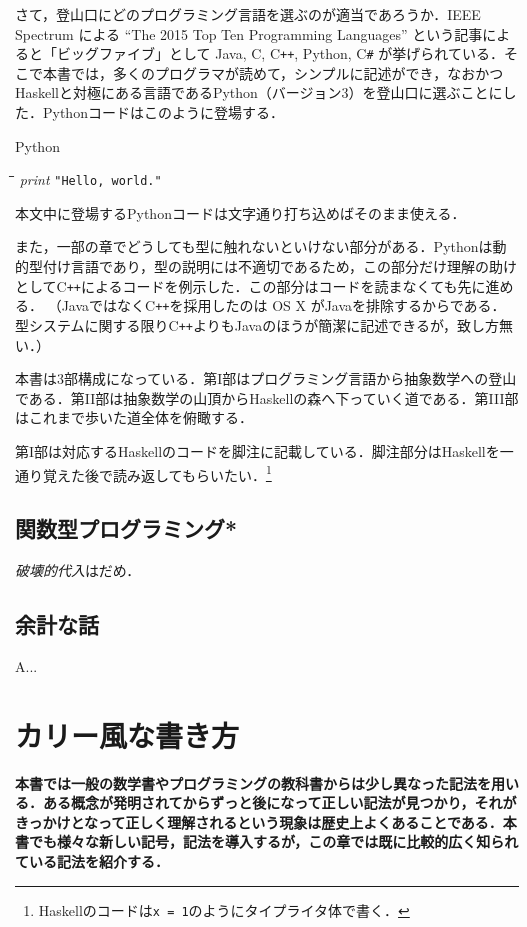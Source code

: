 \documentclass[twocolumn]{jsbook}
\newcommand{\cxx}{\textrm{C}\texttt{++}}
\newcommand{\keyword}[1]{{\emph{#1}}}
\newcommand{\code}[1]{\texttt{#1}}
\newenvironment{leader}{\begingroup\bf}{\endgroup}
\newenvironment{pythoncode}{\begin{itembox}[r]{Python}}{\end{itembox}}
\newenvironment{python}{\begin{tabbing}\hspace*{1em}\=\hspace*{1em}\=\hspace*{1em}\=\hspace*{1em}\=\kill}{\end{tabbing}}
\newcommand{\pthnId}[1]{\textit{#1}}
\newcommand{\pthnString}[1]{\texttt{#1}}
\begin{document}
さて，登山口にどのプログラミング言語を選ぶのが適当であろうか．IEEE Spectrum による ``The 2015 Top Ten Programming Languages'' という記事によると「ビッグファイブ」として Java, C, \cxx, Python, C\texttt{\#} が挙げられている．そこで本書では，多くのプログラマが読めて，シンプルに記述ができ，なおかつHaskellと対極にある言語であるPython（バージョン3）を登山口に選ぶことにした．Pythonコードはこのように登場する．
\begin{pythoncode}
\begin{python}
\pthnId{print} \pthnString{"Hello, world."}
\end{python}
\end{pythoncode}
本文中に登場するPythonコードは文字通り打ち込めばそのまま使える．

また，一部の章でどうしても型に触れないといけない部分がある．Pythonは動的型付け言語であり，型の説明には不適切であるため，この部分だけ理解の助けとして\cxx によるコードを例示した．この部分はコードを読まなくても先に進める． （Javaではなく\cxx を採用したのは OS X がJavaを排除するからである．型システムに関する限り\cxx よりもJavaのほうが簡潔に記述できるが，致し方無い．）

本書は3部構成になっている．第I部はプログラミング言語から抽象数学への登山である．第II部は抽象数学の山頂からHaskellの森へ下っていく道である．第III部はこれまで歩いた道全体を俯瞰する．

第I部は対応するHaskellのコードを脚注に記載している．脚注部分はHaskellを一通り覚えた後で読み返してもらいたい．\footnote{Haskellのコードは\code{x = 1}のようにタイプライタ体で書く．}

\section{関数型プログラミング*}

\keyword{破壊的代入}はだめ．

\section{余計な話}

A...

\chapter{カリー風な書き方}

\begin{leader}
本書では一般の数学書やプログラミングの教科書からは少し異なった記法を用いる．ある概念が発明されてからずっと後になって正しい記法が見つかり，それがきっかけとなって正しく理解されるという現象は歴史上よくあることである．本書でも様々な新しい記号，記法を導入するが，この章では既に比較的広く知られている記法を紹介する．
\end{leader}
\end{document}
